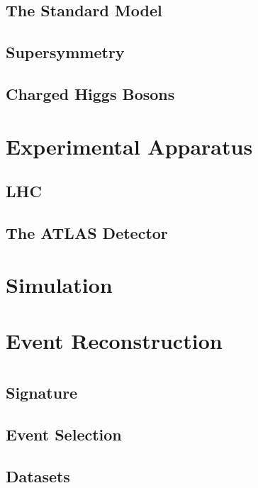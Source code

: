 \documentclass[aspectratio=169,xcolor=table]{beamer}
\begin{document}
  \subsection{The Standard Model}

  \subsection{Supersymmetry}

  \subsection{Charged Higgs Bosons}

\section{Experimental Apparatus}

  \subsection{LHC}

  \subsection{The ATLAS Detector}

\section{Simulation}

\section{Event Reconstruction}

\section{\HpmLong}
  
  \subsection{Signature}

  \subsection{Event Selection}

  \subsection{Datasets}
\end{document}
